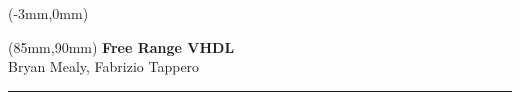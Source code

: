 \documentclass[11pt,b5paper]{book} %
\begin{document}
	
	\thispagestyle{empty}
	\begin{textblock*}{160mm}(-3mm,0mm)
	\noindent{}  %
	\end{textblock*}
	\null\newpage %

	\thispagestyle{empty}
	\null\newpage

	\thispagestyle{empty}
	\begin{textblock*}{60mm}(85mm,90mm)
	\noindent
	{\sffamily\LARGE\bfseries Free Range VHDL}\\
	\noindent
	{\sffamily\small Bryan Mealy, Fabrizio Tappero}\\
	{\color{dark-gray}\rule[5pt]{170pt}{3pt}}
	\end{textblock*}
	\null\newpage
\end{document}
